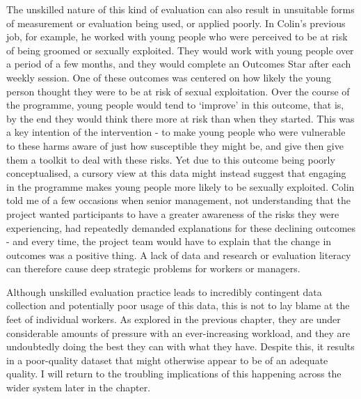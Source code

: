 The unskilled nature of this kind of evaluation can also result in unsuitable forms of measurement or evaluation being used, or applied poorly. In Colin's previous job, for example, he worked with young people who were perceived to be at risk of being groomed or sexually exploited. They would work with young people over a period of a few months, and they would complete an Outcomes Star after each weekly session. One of these outcomes was centered on how likely the young person thought they were to be at risk of sexual exploitation. Over the course of the programme, young people would tend to `improve' in this outcome, that is, by the end they would think there more at risk than when they started. This was a key intention of the intervention - to make young people who were vulnerable to these harms aware of just how susceptible they might be, and give then give them a toolkit to deal with these risks. Yet due to this outcome being poorly conceptualised, a cursory view at this data might instead suggest that engaging in the programme makes young people more likely to be sexually exploited. Colin told me of a few occasions when senior management, not understanding that the project wanted participants to have a greater awareness of the risks they were experiencing, had repeatedly demanded explanations for these declining outcomes - and every time, the project team would have to explain that the change in outcomes was a positive thing. A lack of data and research or evaluation literacy can therefore cause deep strategic problems for workers or  managers.

Although unskilled evaluation practice leads to incredibly contingent data collection and potentially poor usage of this data, this is not to lay blame at the feet of individual workers. As explored in the previous chapter, they are under considerable amounts of pressure with an ever-increasing workload, and they are undoubtedly doing the best they can with what they have. Despite this, it results in a poor-quality dataset that might otherwise appear to be of an adequate quality. I will return to the troubling implications of this happening across the wider system later in the chapter.

